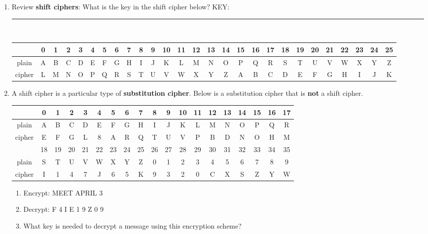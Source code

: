 \documentclass[12pt]{article}
\renewcommand{\emph}[1]{\textsf{\textbf{#1}}}
\newcommand{\ans}[1][1in]{\rule{#1}{.5pt}}
\begin{document}
\begin{enumerate}
\item Review \emph{shift ciphers}: What is the key in the shift cipher below? KEY: \ans\\

\hspace*{-2.2cm}
{\scriptsize
\begin{tabular}{|c|c|c|c|c|c|c|c|c|c|c|c|c|c|c|c|c|c|c|c|c|c|c|c|c|c|c|}
\hline
&0&1&2&3&4&5&6&7&8&9&10&11&12&13&14&15&16&17&18&19&20&21&22&23&24&25\\ \hline \hline
plain& A&B&C&D&E&F&G&H&I&J&K&L&M&N&O&P&Q&R&S&T&U&V&W&X&Y&Z\\  \hline
cipher&L &M&N&O&P&Q&R&S&T&U&V&W&X&Y&Z&A&B&C&D&E&F&G&H&I&J&K\\[12pt]
\hline
\end{tabular}
}
\item A shift cipher is a particular type of \emph{substitution cipher}. Below is a substitution cipher that is \textbf{not} a shift cipher.\\


{\scriptsize
\begin{tabular}{|c|c|c|c|c|c|c|c|c|c|c|c|c|c|c|c|c|c|c|}
\hline
&0&1&2&3&4&5&6&7&8&9&10&11&12&13&14&15&16&17\\ \hline \hline
plain& A&B&C&D&E&F&G&H&I&J&K&L&M&N&O&P&Q&R\\  \hline
cipher&E&F&G&L&8&A&R&Q&T&U&V&P&B&D&N&O&H&M\\
\hline \hline
&18&19&20&21&22&23&24&25&26&27&28&29&30&31&32&33&34&35\\ \hline \hline
plain&S&T&U&V&W&X&Y&Z&0&1&2&3&4&5&6&7&8&9\\ \hline
cipher&I&1&4&7&J&6&5&K&9&3&2&0&C&X&S&Z&Y&W \\
[12pt]
\hline
\end{tabular}
}
	\begin{enumerate}
	\item Encrypt: \textsf{MEET APRIL 3}
	
	\vfill
	
	\item Decrypt: \textsf{F 4 I E 1 9 Z 0 9}
	
	\vfill
	
	\item What key is needed to decrypt a message using this encryption scheme?
	

\end{enumerate}
\end{enumerate}
\end{document}

